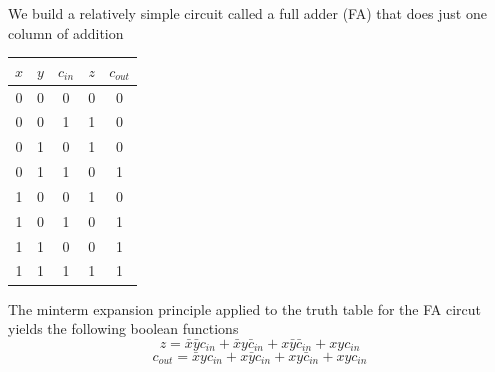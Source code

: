 \documentclass[8pt,a4paper,compress]{beamer}
\begin{document}
\begin{frame}[fragile]
\pause

We build a relatively simple circuit called a full adder (FA) that does just one column of addition

\bigskip

\begin{minipage}{150pt}
\begin{center}
\end{center}
\end{minipage}%
\begin{minipage}{150pt}
\begin{center}
\begin{tabular}{ccc|cc}
$x$ & $y$ & $c_{in}$ & $z$ & $c_{out}$ \\ \hline
0 & 0 & 0 & 0 & 0 \\
0 & 0 & 1 & 1 & 0 \\
0 & 1 & 0 & 1 & 0 \\
0 & 1 & 1 & 0 & 1 \\
1 & 0 & 0 & 1 & 0 \\
1 & 0 & 1 & 0 & 1 \\
1 & 1 & 0 & 0 & 1 \\
1 & 1 & 1 & 1 & 1
\end{tabular}
\end{center}
\end{minipage}

\pause
\bigskip

The minterm expansion principle applied to the truth table for the FA circut yields the following boolean functions 
\pause
$$z = \bar{x}\bar{y}c_{in}+\bar{x}y\bar{c}_{in}+x\bar{y}\bar{c}_{in}+xyc_{in}$$ 
\pause
$$c_{out} = \bar{x}yc_{in}+x\bar{y}c_{in}+xy\bar{c}_{in}+xyc_{in}$$

\end{frame}
\end{document}
